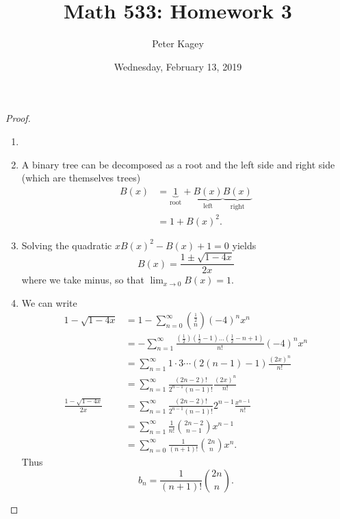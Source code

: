 \documentclass{article}
\newenvironment{problem}[2][Problem]{\begin{trivlist}
\item[\hskip \labelsep {\bfseries #1}\hskip \labelsep {\bfseries #2.}]}{\end{trivlist}}
\begin{document}
\title{Math 533: Homework 3}
\author{Peter Kagey}
\date{Wednesday, February 13, 2019}

\maketitle

\begin{problem}{1}
\end{problem}

\begin{proof} ~
  \begin{enumerate}
    \item ~\\\vspace{10cm}
    \item A binary tree can be decomposed as a root and the left side and right side (which are themselves trees)
    \begin{align*}
      B(x) &= \underbrace{1}_\text{root} + \underbrace{B(x)}_\text{left}\underbrace{B(x)}_\text{right} \\
      &= 1 + B(x)^2.
    \end{align*}
    \item Solving the quadratic $xB(x)^2 - B(x) + 1 = 0$ yields \[
      B(x) = \frac{1 \pm \sqrt{1 - 4x}}{2x}
    \] where we take minus, so that $\displaystyle\lim_{x\rightarrow0}B(x) = 1$.
  \item We can write \begin{align*}
    1 - \sqrt{1 - 4x}
      &= 1 - \sum_{n = 0}^\infty \binom{\frac 12}{n}(-4)^nx^n \\
      &= - \sum_{n=1}^\infty \frac{(\frac 12)(\frac 12 - 1) \hdots (\frac 12 - n + 1)}{n!}(-4)^nx^n \\
      &= \sum_{n=1}^\infty 1 \cdot 3 \cdots (2(n-1) - 1)\frac{(2x)^n}{n!} \\
      &= \sum_{n=1}^\infty \frac{(2n-2)!}{2^{n-1}(n-1)!}\frac{(2x)^n}{n!} \\
    \frac{1 - \sqrt{1 - 4x}}{2x}
    &= \sum_{n=1}^\infty \frac{(2n-2)!}{2^{n-1}(n-1)!}2^{n-1}\frac{x^{n-1}}{n!} \\
    &= \sum_{n=1}^\infty \frac{1}{n!}\binom{2n-2}{n-1}x^{n-1} \\
    &= \sum_{n=0}^\infty \frac{1}{(n+1)!}\binom{2n}{n}x^n.
  \end{align*}
  Thus \[
    b_n = \frac{1}{(n+1)!}\binom{2n}{n}.
  \]
  \end{enumerate}
\end{proof}
\begin{problem}{2}
\end{problem}
\end{document}
